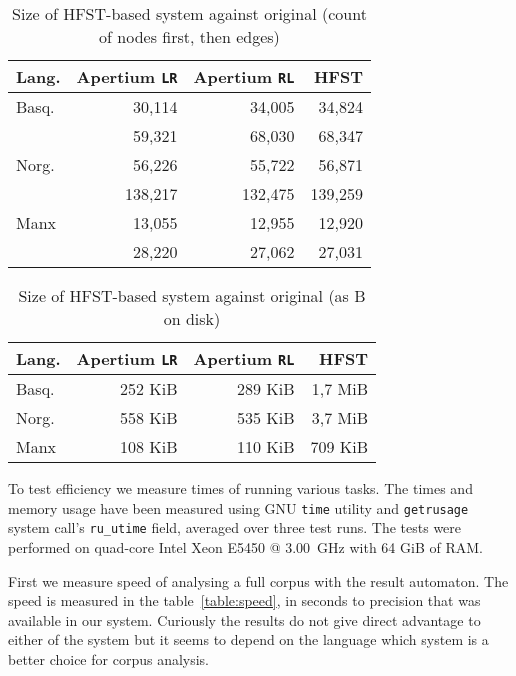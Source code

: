 \documentclass[10pt,a4paper]{article}
\begin{document}
\begin{table}[h]
\begin{center}
\begin{tabular}{|l|r|r|r|}
\hline
\bf Lang. & \bf Apertium {\tt {\small LR}} & \bf Apertium {\tt {\small RL}} & \bf HFST \\
\hline
Basq.      & 30,114  & 34,005  & 34,824  \\
             & 59,321  & 68,030  & 68,347  \\
Norg. & 56,226  & 55,722  & 56,871  \\
             & 138,217 & 132,475 & 139,259 \\
Manx         & 13,055  & 12,955  & 12,920  \\
             & 28,220  & 27,062  & 27,031  \\
\hline
\end{tabular}
\caption{Size of HFST-based system against original (count of nodes first, then
edges)
\label{table:graph-size}}
\end{center}
\end{table}

\begin{table}[h]
\begin{center}
\begin{tabular}{|l|r|r|r|}
\hline
\bf Lang. & \bf Apertium {\tt {\small LR}} & \bf Apertium {\tt {\small RL}}  & \bf HFST \\
\hline
Basq.       & 252 KiB & 289 KiB & 1,7 MiB \\
Norg. & 558 KiB & 535 KiB & 3,7 MiB \\
Manx         & 108 KiB & 110 KiB & 709 KiB \\
\hline
\end{tabular}
\caption{Size of HFST-based system against original (as B on disk)
\label{table:size}}
\end{center}
\end{table}

To test efficiency we measure times of running various tasks.  The times and
memory usage have been measured using GNU \texttt{time} utility and
\texttt{getrusage} system call's \texttt{ru\_utime} field, averaged over three
test runs. The tests were performed on quad-core Intel Xeon E5450 @ 3.00~GHz
with 64 GiB of RAM. 

First we measure speed of analysing a full corpus with the result automaton.
The speed is measured in the table~\ref{table:speed}, in
seconds to precision that was available in our system. Curiously the results
do not give direct advantage to either of the system but it seems to
depend on the language which system is a better choice for corpus analysis.
\end{document}
